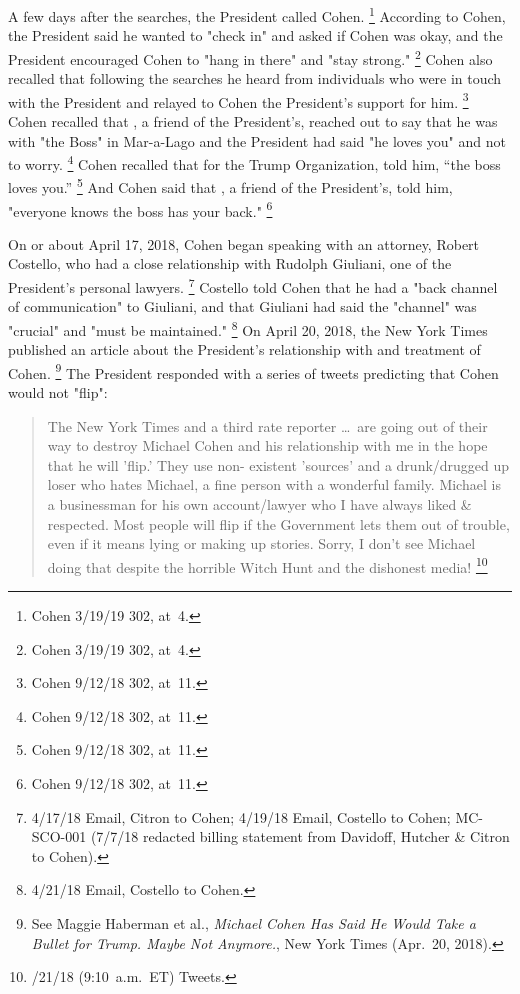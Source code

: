 {A few days after the searches, the President called Cohen.%
\footnote{Cohen 3/19/19 302, at~4.}
According to Cohen, the President said he wanted to "check in" and asked if Cohen was okay, and the President encouraged Cohen to "hang in there" and "stay strong."%
\footnote{Cohen 3/19/19 302, at~4.}
Cohen also recalled that following the searches he heard from individuals who were in touch with the President and relayed to Cohen the President's support for him.%
\footnote{Cohen 9/12/18 302, at~11.}
Cohen recalled that , a friend of the President's, reached out to say that he was with "the Boss" in Mar-a-Lago and the President had said "he loves you" and not to worry.%
\footnote{Cohen 9/12/18 302, at~11.}
Cohen recalled that  for the Trump Organization, told him, ``the boss loves you.''%
\footnote{Cohen 9/12/18 302, at~11.}
And Cohen said that , a friend of the President's, told him, "everyone knows the boss has your back."%
\footnote{Cohen 9/12/18 302, at~11.}

On or about April 17, 2018, Cohen began speaking with an attorney, Robert Costello, who had a close relationship with Rudolph Giuliani, one of the President's personal lawyers.%
\footnote{4/17/18 Email, Citron to Cohen;
4/19/18 Email, Costello to Cohen;
MC-SCO-001 (7/7/18 redacted billing statement from Davidoff, Hutcher \& Citron to Cohen).}
Costello told Cohen that he had a "back channel of communication" to Giuliani, and that Giuliani had said the "channel" was "crucial" and "must be maintained."%
\footnote{4/21/18 Email, Costello to Cohen.}
On April 20, 2018, the New York Times published an article about the President's relationship with and treatment of Cohen.%
\footnote{See Maggie Haberman et al., \textit{Michael Cohen Has Said He Would Take a Bullet for Trump. Maybe Not Anymore.}, New York Times (Apr.~20, 2018).}
The President responded with a series of tweets predicting that Cohen would not "flip":

\begin{quote}
The New York Times and a third rate reporter \dots\ are going out of their way to destroy Michael Cohen and his relationship with me in the hope that he will 'flip.'
They use non- existent 'sources' and a drunk/drugged up loser who hates Michael, a fine person with a wonderful family.
Michael is a businessman for his own account/lawyer who I have always liked \& respected.
Most people will flip if the Government lets them out of trouble, even if it means lying or making up stories.
Sorry, I don't see Michael doing that despite the horrible Witch Hunt and the dishonest media!%
\footnote{/21/18 (9:10~a.m.~ET) Tweets.}
\end{quote}

}

